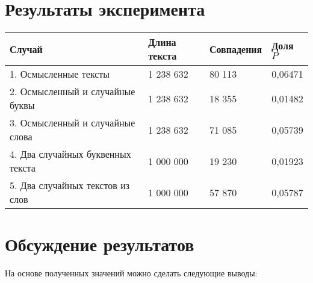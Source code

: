 \documentclass[a4paper,12pt]{article}
\begin{document}
\section{Результаты эксперимента}
\captionsetup[longtable]{labelformat=empty}
\begin{longtable}{|p{3cm}|p{3cm}|p{3cm}|p{3cm}|}
\hline
Случай & Длина текста & Совпадения & Доля $P$ \\
\hline
\endhead

1. Осмысленные тексты & 1 238 632 & 80 113 & 0,06471 \\
\hline
2. Осмысленный и случайные буквы & 1 238 632 & 18 355 & 0,01482 \\
\hline
3. Осмысленный и случайные слова & 1 238 632 & 71 085 & 0,05739 \\
\hline
4. Два случайных буквенных текста & 1 000 000 & 19 230 & 0,01923 \\
\hline
5. Два случайных текстов из слов & 1 000 000 & 57 870 & 0,05787 \\
\hline
\end{longtable}

\section{Обсуждение результатов}
На основе полученных значений можно сделать следующие выводы:
\end{document}

